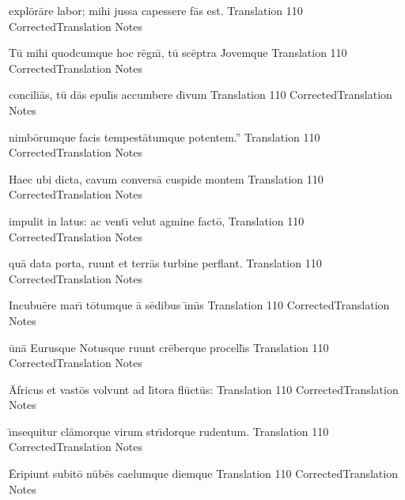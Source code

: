 \documentclass[]{article}
\begin{document}
\latline
  {expl\={o}r\={a}re labor; mihi jussa capessere f\={a}s est.}
  { Translation }
  {110}
  { CorrectedTranslation }
  { Notes }


\latline
  {T\={u} mihi quodcumque hoc r\={e}gn\={\i}, t\={u} sc\={e}ptra Jovemque}
  { Translation }
  {110}
  { CorrectedTranslation }
  { Notes }


\latline
  {concili\={a}s, t\={u} d\={a}s epul\={\i}s accumbere d\={\i}vum}
  { Translation }
  {110}
  { CorrectedTranslation }
  { Notes }


\latline
  {nimb\={o}rumque facis tempest\={a}tumque potentem.''}
  { Translation }
  {110}
  { CorrectedTranslation }
  { Notes }


\latline
  {Haec ubi dicta, cavum convers\={a} cuspide montem}
  { Translation }
  {110}
  { CorrectedTranslation }
  { Notes }


\latline
  {impulit in latus:  ac vent\={\i} velut agmine fact\={o},}
  { Translation }
  {110}
  { CorrectedTranslation }
  { Notes }


\latline
  {qu\={a} data porta, ruunt et terr\={a}s turbine perflant.}
  { Translation }
  {110}
  { CorrectedTranslation }
  { Notes }


\latline
  {Incubu\={e}re mar\={\i} t\={o}tumque \={a} s\={e}dibus \={\i}m\={\i}s}
  { Translation }
  {110}
  { CorrectedTranslation }
  { Notes }


\latline
  {\={u}n\={a} Eurusque Notusque ruunt cr\={e}berque procell\={\i}s}
  { Translation }
  {110}
  { CorrectedTranslation }
  { Notes }


\latline
  {\={A}fricus et vast\={o}s volvunt ad l\={\i}tora fl\={u}ct\={u}s:}
  { Translation }
  {110}
  { CorrectedTranslation }
  { Notes }


\latline
  {\={\i}nsequitur cl\={a}morque virum str\={\i}dorque rudentum.}
  { Translation }
  {110}
  { CorrectedTranslation }
  { Notes }


\latline
  {\={E}ripiunt subit\={o} n\={u}b\={e}s caelumque diemque}
  { Translation }
  {110}
  { CorrectedTranslation }
  { Notes }
\end{document}

